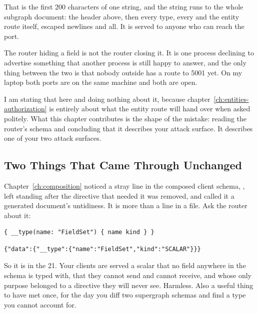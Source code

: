 %
That is the first 200 characters of one string, and the string runs to the
whole subgraph document: the  header above, then every type, every
 and the entity route itself, escaped newlines and all. It is
served to anyone who can reach the port.

%
The router hiding a field is not the router closing it. It is one process
declining to advertise something that another process is still happy to answer,
and the only thing between the two is that nobody outside has a route to 5001
yet. On my laptop both ports are on the same machine and both are open.

I am stating that here and doing nothing about it, because
chapter~\ref{ch:entities-authorization} is entirely about what the entity route
will hand over when asked politely. What this chapter contributes is the shape
of the mistake: reading the router's schema and concluding that it describes
your attack surface. It describes one of your two attack surfaces.

\subsection{Two Things That Came Through Unchanged}

%
Chapter~\ref{ch:composition} noticed a stray line in the composed client
schema, , left standing after the directive that needed
it was removed, and called it a generated document's untidiness. It is more than
a line in a file. Ask the router about it:

\begin{verbatim}
{ __type(name: "FieldSet") { name kind } }
\end{verbatim}

\begin{verbatim}
{"data":{"__type":{"name":"FieldSet","kind":"SCALAR"}}}
\end{verbatim}

%
So it is in the 21. Your clients are served a scalar that no field anywhere in
the schema is typed with, that they cannot send and cannot receive, and whose
only purpose belonged to a directive they will never see. Harmless. Also a
useful thing to have met once, for the day you diff two supergraph schemas and
find a type you cannot account for.

